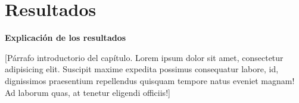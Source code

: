 \chapter{Resultados}\label{chap:resultados}
\textbf{Explicación de los resultados}

[Párrafo introductorio del capítulo. Lorem ipsum dolor sit amet, consectetur adipisicing elit. Suscipit maxime expedita possimus consequatur labore, id, dignissimos praesentium repellendus quisquam tempore natus eveniet magnam! Ad laborum quas, at tenetur eligendi officiis!]
